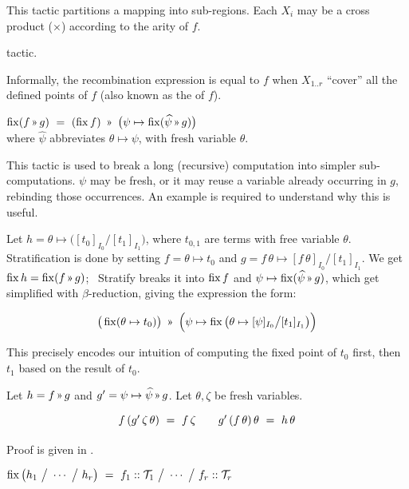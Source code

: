 This tactic partitions a mapping into sub-regions. Each $X_i$ may be a cross product ($\times$)
according to the arity of $f$.

\Obligations tactic.

Informally, the recombination expression is equal to $f$
when $X_{1..r}$ ``cover'' all the defined points of $f$ (also known as the  of $f$).

\medskip
{}
$\fix (f\applt g) ~=~ (\fix f) ~\applt~ \big(\psi\mapsto \fix (\widehat\psi\applt g)\big)$
\\
where $\widehat\psi$ abbreviates $\theta\mapsto\psi$, with fresh variable $\theta$.

This tactic is used to break a long (recursive) computation into simpler sub-computations.
$\psi$ may be fresh, or it may reuse a variable already occurring in $g$, rebinding those occurrences.
An example is required to understand why this is useful.

Let $h=\theta\mapsto\big([t_0]_{I_0}\big/[t_1]_{I_1}\big)$, where $t_{0,1}$ are terms with free variable $\theta$.
Stratification is done by setting $f=\theta\mapsto t_0$ and
 $g=f\,\theta\mapsto [f\,\theta]_{I_0}\big/[t_1]_{I_1}$. We get $\fix h=\fix(f\applt g)$; {\sf~Stratify}
breaks it into $\operatorname{fix} f$ and $\psi\mapsto \fix (\widehat\psi\applt g)$,
which get simplified with $\beta$-reduction, giving the expression the form:

\vspace{-5mm}
\[\big(\fix(\theta\mapsto t_0)\big) ~\applt~ 
  \Big(\psi\mapsto \fix \big(\theta\mapsto[\psi]_{I_0}\big/[t_1]_{I_1}\big)\Big)\]

\vspace{-2mm}
This precisely encodes our intuition of computing the fixed point of $t_0$ first,
then $t_1$ based on the result of $t_0$.

\Obligations Let $h=f\applt g$ and $g'=\psi\mapsto\widehat\psi\applt g$. Let $\theta,\zeta$ be
fresh variables.
\begin{equation}
\renewcommand\arraystretch{1.5}
\begin{array}{l@{\qquad}l}
f\,(g'\,\zeta\,\theta) ~=~ f\,\zeta &
g'\,(f\,\theta)\,\theta ~=~ h\,\theta
\end{array}
\label{tactics:Stratify obligations}
\end{equation}

Proof is given in .

 \label{tactics:Synth}
$\operatorname{fix}\big(h_1 ~\big/~ \cdots ~\big/~ h_r\big) ~=~ 
  f_1 :: \mathcal{T}_1 ~\big/~ \cdots ~\big/~ f_r :: \mathcal{T}_r$

